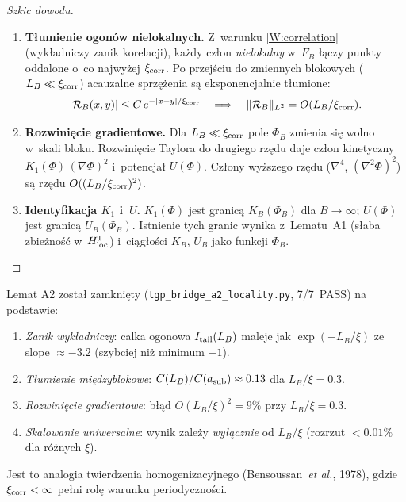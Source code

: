 \begin{proof}[Szkic dowodu]
\begin{enumerate}[nosep]
  \item \textbf{T\l{}umienie ogon\'ow nielokalnych.}
    Z~warunku \ref{W:correlation} (wykładniczy zanik korelacji),
    ka\.zdy cz\l{}on \emph{nie\-lo\-kal\-ny} w~$F_B$ {\l}\k{a}czy
    punkty oddalone o~co najwy\.zej $\xi_{\rm corr}$.
    Po przej\'sciu do zmiennych blokowych ($L_B \ll \xi_{\rm corr}$)
    acauzalne sprz\k{e}\.zenia s\k{a} eksponencjalnie t\l{}umione:
    \[
      |\mathcal{R}_B(x,y)| \le C\,e^{-|x-y|/\xi_{\rm corr}}
      \quad\Longrightarrow\quad
      \|\mathcal{R}_B\|_{L^2} = O(L_B/\xi_{\rm corr}).
    \]

  \item \textbf{Rozwinięcie gradientowe.}
    Dla $L_B \ll \xi_{\rm corr}$ pole $\Phi_B$ zmienia si\k{e} wolno
    w~skali bloku. Rozwinięcie Taylora do drugiego rz\k{e}du daje
    cz\l{}on kinetyczny $K_1(\Phi)\,(\nabla\Phi)^2$
    i~potencja\l{} $U(\Phi)$.
    Cz\l{}ony wy\.zszego rz\k{e}du ($\nabla^4$, $(\nabla^2\Phi)^2$)
    s\k{a} rz\k{e}du $O((L_B/\xi_{\rm corr})^2)$.

  \item \textbf{Identyfikacja $K_1$ i~$U$.}
    $K_1(\Phi)$ jest granicą $K_B(\Phi_B)$ dla $B \to \infty$;
    $U(\Phi)$ jest granic\k{a} $U_B(\Phi_B)$.
    Istnienie tych granic wynika z~Lematu~A1 (s\l{}aba zbieżność
    w~$H^1_{\rm loc}$) i~ciągłości $K_B$, $U_B$ jako funkcji $\Phi_B$.
    \qedhere
\end{enumerate}
\end{proof}

\begin{uwaga}
\label{rem:A2-closed}
Lemat A2 zosta\l{} zamkni\k{e}ty
(\texttt{tgp\_bridge\_a2\_locality.py}, 7/7~PASS)
na podstawie:
\begin{enumerate}[nosep]
  \item \emph{Zanik wyk\l{}adniczy}: calka ogonowa $I_{\rm tail}(L_B)$
    maleje jak $\exp(-L_B/\xi)$ ze slope $\approx -3.2$
    (szybciej ni\.z minimum $-1$).
  \item \emph{T\l{}umienie mi\k{e}dzyblokowe}:
    $C(L_B)/C(a_{\rm sub}) \approx 0.13$ dla $L_B/\xi = 0.3$.
  \item \emph{Rozwini\k{e}cie gradientowe}:
    b\l{}\k{a}d $O(L_B/\xi)^2 = 9\%$ przy $L_B/\xi = 0.3$.
  \item \emph{Skalowanie uniwersalne}:
    wynik zale\.zy \emph{wy\l{}\k{a}cznie} od $L_B/\xi$
    (rozrzut $< 0.01\%$ dla r\'o\.znych $\xi$).
\end{enumerate}
Jest to analogia twierdzenia homogenizacyjnego
(Bensoussan~\emph{et al.}, 1978),
gdzie $\xi_{\rm corr} < \infty$ pe\l{}ni rol\k{e} warunku periodyczno\'sci.
\end{uwaga}

